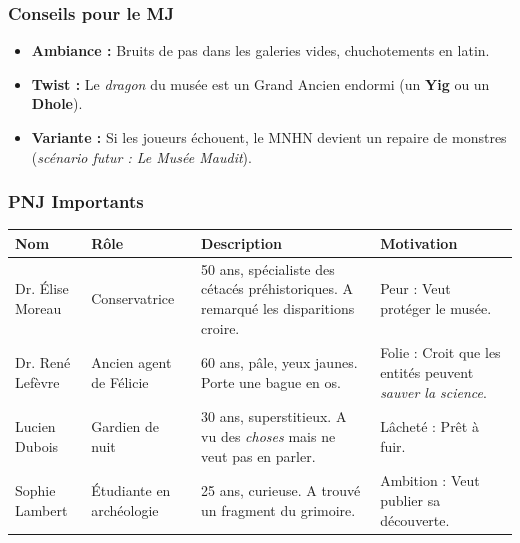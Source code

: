 \documentclass[10pt,a5paper,twoside]{book}
\begin{document}
\subsubsection*{Conseils pour le MJ}
\begin{itemize}
	\item \textbf{Ambiance :} Bruits de pas dans les galeries vides, chuchotements en latin.
	\item \textbf{Twist :} Le \textit{dragon} du musée est un Grand Ancien endormi (un \textbf{Yig} ou un \textbf{Dhole}).
	\item \textbf{Variante :} Si les joueurs échouent, le MNHN devient un repaire de monstres (\textit{scénario futur : Le Musée Maudit}).
\end{itemize}

\newpage

\subsubsection*{PNJ Importants}
\begin{center}
	\begin{tabular}{|P{2cm}|P{3cm}|P{3.5cm}|P{2.5cm}|} 
	\hline
	\textbf{Nom} 		& \textbf{Rôle} 			& \textbf{Description} & \textbf{Motivation} \\ \hline
	Dr. Élise Moreau 	& Conservatrice 			& 50 ans, spécialiste des cétacés préhistoriques. A remarqué les disparitions croire. 	& Peur : Veut protéger le musée. \\ \hline
	Dr. René Lefèvre 	& Ancien agent de Félicie 	& 60 ans, pâle, yeux jaunes. Porte une bague en os. 							& Folie : Croit que les entités peuvent \textit{sauver la science}. \\ \hline
	Lucien Dubois 		& Gardien de nuit 			& 30 ans, superstitieux. A vu des \textit{choses} mais ne veut pas en parler. 			& Lâcheté : Prêt à fuir. \\ \hline
	Sophie Lambert 		& Étudiante en archéologie 	& 25 ans, curieuse. A trouvé un fragment du grimoire. 						& Ambition : Veut publier sa découverte. \\ \hline
	\end{tabular}
\end{center}
\end{document}
